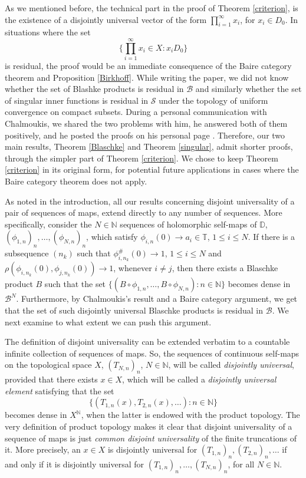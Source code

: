 \documentclass[12pt,a4paper]{amsart}
\theoremstyle{plain}
\theoremstyle{definition}
\theoremstyle{remark}
\theoremstyle{fact}
\begin{document}
    As we mentioned before, the technical part in the proof of Theorem \ref{criterion}, is the existence of a disjointly universal vector of the form $\prod_{i=1}^{\infty}x_i$, for $x_i \in D_0$. In situations where the set
    $$
    \{ \prod_{i=1}^{\infty}x_i \in X: x_i D_0\}
    $$
    is residual, the proof would be an immediate consequence of the Baire category theorem and Proposition \ref{Birkhoff}. While writing the paper, we did not know whether the set of Blashke products is residual in $\mathcal{B}$ and similarly whether the set of singular inner functions is residual in $\mathcal{S}$ under the topology of uniform convergence on compact subsets. During a personal communication with Chalmoukis, we shared the two problems with him, he answered both of them positively, and he posted the proofs on his personal page \cite{Cha}. Therefore, our two main results, Theorem \ref{Blaschke} and Theorem \ref{singular}, admit shorter proofs, through the simpler part of Theorem \ref{criterion}. We chose to keep Theorem \ref{criterion} in its original form, for potential future applications in cases where the Baire category theorem does not apply. 

    As noted in the introduction, all our results concerning disjoint universality of a pair of sequences of maps, extend directly to any number of sequences. More specifically, consider the $N\in \mathbb{N}$ sequences of holomorphic self-maps of $\mathbb{D}$, $(\phi_{1,n})_n, \dots ,(\phi_{N,n})_n$, which satisfy $\phi_{i,n}(0)\rightarrow a_i\in \mathbb{T}$, $1\leq i\leq N$. If there is a subsequence $(n_k)$ such that $\phi_{i,n_k}^\#(0)\rightarrow 1$, $1\leq i\leq N$ and $\rho(\phi_{i,n_k}(0), \phi_{j,n_k}(0))\rightarrow 1$, whenever $i\neq j$, then there exists a Blaschke product $B$ such that the set $\{(B\circ \phi_{1,n},\dots ,B\circ \phi_{N,n}): n\in \mathbb{N}\}$ becomes dense in $\mathcal{B}^N$. Furthermore, by Chalmoukis's result \cite{Cha} and a Baire category argument, we get that the set of such disjointly universal Blaschke products is residual in $\mathcal{B}$. We next examine to what extent we can push this argument.

    The definition of disjoint universality can be extended verbatim to a countable infinite collection of sequences of maps. So, the sequences of continuous self-maps on the topological space $X$, $(T_{N,n})_n$, $N\in \mathbb{N}$, will be called {\it disjointly universal}, provided that there exists $x\in X$, which will be called a {\it disjointly universal element} satisfying that the set
    $$
    \{(T_{1,n}(x), T_{2,n}(x),\dots ): n\in \mathbb{N}\}
    $$
    becomes dense in $X^{\mathbb{N}}$, when the latter is endowed with the product topology. The very definition of product topology makes it clear that disjoint universality of a sequence of maps is just {\it common disjoint universality} of the finite truncations of it. More precisely, an $x\in X$ is disjointly universal for $(T_{1,n})_n, (T_{2,n})_n, \dots$ if and only if it is disjointly universal for $(T_{1,n})_n, \dots , (T_{N,n})_n$, for all $N\in \mathbb{N}$. 
\end{document}
